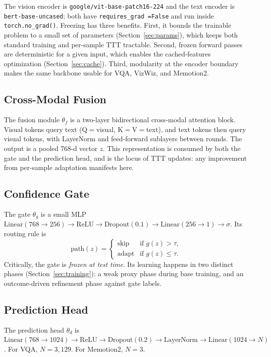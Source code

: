 \documentclass[conference]{IEEEtran}
\begin{document}
The vision encoder is \texttt{google/vit-base-patch16-224} and the text
encoder is \texttt{bert-base-uncased}; both have \texttt{requires\_grad
=False} and run inside \texttt{torch.no\_grad()}. Freezing has three
benefits. First, it bounds the trainable problem to a small set of
parameters (Section~\ref{sec:params}), which keeps both standard training
and per-sample TTT tractable. Second, frozen forward passes are
deterministic for a given input, which enables the cached-features
optimization (Section~\ref{sec:cache}). Third, modularity at the encoder
boundary makes the same backbone usable for VQA, VizWiz, and Memotion2.

\subsection{Cross-Modal Fusion}

The fusion module $\theta_f$ is a two-layer bidirectional cross-modal
attention block. Visual tokens query text (Q$=$visual, K$=$V$=$text), and
text tokens then query visual tokens, with LayerNorm and feed-forward
sublayers between rounds. The output is a pooled 768-d vector $z$. This
representation is consumed by both the gate and the prediction head, and
is the locus of TTT updates: any improvement from per-sample adaptation
manifests here.

\subsection{Confidence Gate}

The gate $\theta_g$ is a small MLP
$\mathrm{Linear}(768{\to}256)\!\to\!\mathrm{ReLU}\!\to\!\mathrm{Dropout}(0.1)
\!\to\!\mathrm{Linear}(256{\to}1)\!\to\!\sigma$. Its routing rule is
\[
\text{path}(z) = \begin{cases}
\text{skip}  & \text{if } g(z) > \tau, \\
\text{adapt} & \text{if } g(z) \le \tau.
\end{cases}
\]
Critically, the gate is \emph{frozen at test time}. Its learning
happens in two distinct phases (Section~\ref{sec:training}): a weak
proxy phase during base training, and an outcome-driven refinement
phase against gate labels.

\subsection{Prediction Head}

The prediction head $\theta_d$ is
$\mathrm{Linear}(768{\to}1024)\!\to\!\mathrm{ReLU}\!\to\!\mathrm{Dropout}
(0.2)\!\to\!\mathrm{LayerNorm}\!\to\!\mathrm{Linear}(1024{\to}N)$.
For VQA, $N{=}3{,}129$. For Memotion2, $N{=}3$.
\end{document}
